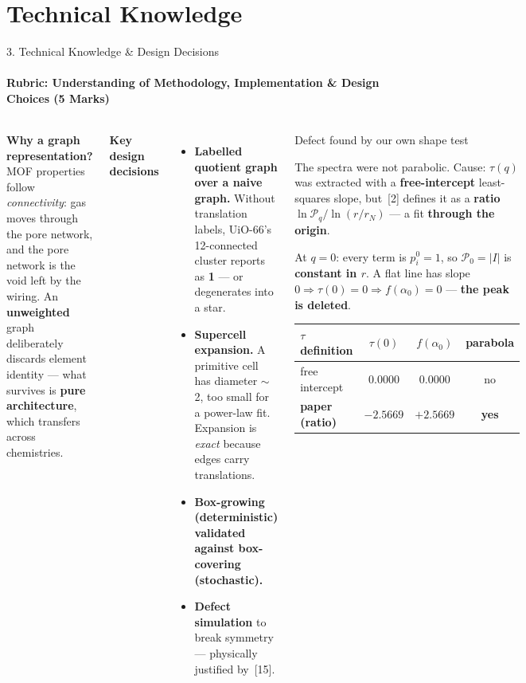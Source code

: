 \documentclass[aspectratio=169, 11pt]{beamer}
\begin{document}
\section{Technical Knowledge}
\begin{frame}{3. Technical Knowledge \& Design Decisions}
\framesubtitle{Rubric: Understanding of Methodology, Implementation \& Design Choices (5 Marks)}
\begin{columns}[T]
{\scriptsize
\textbf{Why a graph representation?} MOF properties follow \textit{connectivity}: gas moves
through the pore network, and the pore network is the void left by the wiring. An
\textbf{unweighted} graph deliberately discards element identity --- what survives is
\textbf{pure architecture}, which transfers across chemistries.

\vspace{0.1cm}
\textbf{Key design decisions}
\begin{itemize}\scriptsize
  \item \textbf{Labelled quotient graph over a naive graph.} Without translation labels,
        UiO-66's 12-connected cluster reports as \textbf{1} --- or degenerates into a star.
  \item \textbf{Supercell expansion.} A primitive cell has diameter $\sim$2, too small for
        a power-law fit. Expansion is \textit{exact} because edges carry translations.
  \item \textbf{Box-growing (deterministic) validated against box-covering (stochastic).}
  \item \textbf{Defect simulation} to break symmetry --- physically justified by~[15].
\end{itemize}
}

\begin{alertblock}{\footnotesize Defect found by our own shape test}
{\scriptsize
The spectra were not parabolic. Cause: $\tau(q)$ was extracted with a
\textbf{free-intercept} least-squares slope, but~[2] defines it as a \textbf{ratio}
$\ln\mathcal{P}_q/\ln(r/r_N)$ --- a fit \textbf{through the origin}.

At $q=0$: every term is $p_i^0=1$, so $\mathcal{P}_0=|I|$ is \textbf{constant in $r$}.
A flat line has slope $0 \Rightarrow \tau(0)=0 \Rightarrow f(\alpha_0)=0$ ---
\textbf{the peak is deleted}.
\vspace{0.08cm}

\begin{tabular}{@{}lccc@{}}
\toprule
$\tau$ definition & $\tau(0)$ & $f(\alpha_0)$ & parabola \\
\midrule
free intercept & 0.0000 & 0.0000 & \textcolor{warnRed}{no} \\
\textbf{paper (ratio)} & $-2.5669$ & $+2.5669$ & \textcolor{okGreen}{\textbf{yes}} \\
\bottomrule
\end{tabular}}
\end{alertblock}


\end{columns}
\end{frame}
\end{document}
